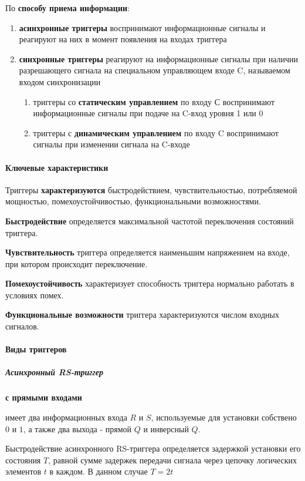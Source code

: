 \documentclass{article}
\begin{document}
\begin{flushleft}
По \textbf{способу приема информации}:

\begin{enumerate}
    \item \textbf{асинхронные триггеры} воспринимают информационные сигналы и реагируют на них в момент появления на входах триггера
    \item \textbf{синхронные триггеры} реагируют на информационные сигналы при наличии разрешающего сигнала на специальном управляющем входе C, называемом входом синхронизации
    \begin{enumerate}
        \item триггеры со \textbf{статическим управлением} по входу С воспринимают информационные сигналы при подаче на C-вход уровня 1 или 0
        \item триггеры с \textbf{динамическим управлением} по входу C воспринимают сигналы при изменении сигнала на C-входе
    \end{enumerate}
\end{enumerate}

\paragraph{Ключевые характеристики}

Триггеры \textbf{характеризуются} быстродействием, чувствительностью, потребляемой мощностью, помехоустойчивостью, функциональными возможностями.

\textbf{Быстродействие} определяется максимальной частотой переключения состояний триггера.

\textbf{Чувствительность} триггера определяется наименьшим напряжением на входе, при котором происходит переключение.

\textbf{Помехоустойчивость} характеризует способность триггера нормально работать в условиях помех.

\textbf{Функциональные возможности} триггера характеризуются числом входных сигналов.

\paragraph{Виды триггеров}

\subparagraph{Асинхронный RS-триггер} \textbf{с прямыми входами}

имеет два информационных входа $R$ и $S$, используемые для установки собствено $0$ и $1$, а также два выхода - прямой $Q$ и инверсный $Q$.

Быстродействие асинхронного RS-триггера определяется задержкой установки его состояния $T$, равной сумме задержек передачи сигнала через цепочку логических элементов $t$ в каждом. В данном случае $T = 2t$


\end{flushleft}
\end{document}
